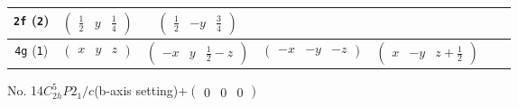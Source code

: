 \documentclass[fleqn,9pt,landscape]{jsarticle}
\begin{document}
\begin{center}
\begin{longtable}{ccccccc}
{\tt 2f} ({\tt 2}) & $ \begin{pmatrix} \frac{1}{2} & y & \frac{1}{4} \end{pmatrix} $ & $ \begin{pmatrix} \frac{1}{2} & - y & \frac{3}{4} \end{pmatrix} $ & $  $ & $  $ \\ \hline
{\tt 4g} ({\tt 1}) & $ \begin{pmatrix} x & y & z \end{pmatrix} $ & $ \begin{pmatrix} - x & y & \frac{1}{2} - z \end{pmatrix} $ & $ \begin{pmatrix} - x & - y & - z \end{pmatrix} $ & $ \begin{pmatrix} x & - y & z + \frac{1}{2} \end{pmatrix} $ \\
\end{longtable}
\end{center}
\newpage
No. 14\quad$C_{2h}^{5}$\quad$P2_1/c$\quad(b-axis setting)\quad[ monoclinic ]\quad$+\begin{pmatrix} 0 & 0 & 0 \end{pmatrix}$
\end{document}
